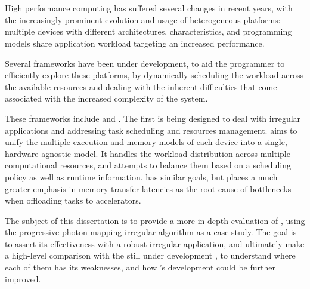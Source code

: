 \documentclass[main.tex]{subfiles}
\begin{document}
\cleardoublepage
{}
{}
\chapter*{\abstractname}

High performance computing has suffered several changes in recent years, with the increasingly prominent evolution and usage of heterogeneous platforms: multiple devices with different architectures, characteristics, and programming models share application workload targeting an increased performance.

Several frameworks have been under development, to aid the programmer to efficiently explore these platforms, by dynamically scheduling the workload across the available resources and dealing with the inherent difficulties that come associated with the increased complexity of the system.

These frameworks include \gama and \starpu. The first is being designed to deal with irregular applications and addressing task scheduling and resources management. \gama aims to unify the multiple execution and memory models of each device into a single, hardware agnostic model. It handles the workload distribution across multiple computational resources, and attempts to balance them based on a scheduling policy as well as runtime information. \starpu has similar goals, but places a much greater emphasis in memory transfer latencies as the root cause of bottlenecks when offloading tasks to accelerators.

The subject of this dissertation is to provide a more in-depth evaluation of \starpu, using the progressive photon mapping irregular algorithm as a case study. The goal is to assert its effectiveness with a robust irregular application, and ultimately make a high-level comparison with the still under development \gama, to understand where each of them has its weaknesses, and how \gama's development could be further improved.
\end{document}
